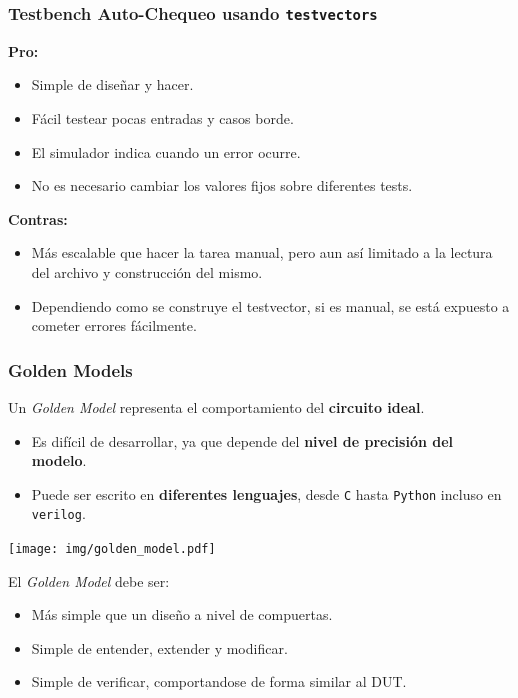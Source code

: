 \documentclass[aspectratio=169]{beamer}
\begin{document}
\begin{frame}[fragile,t]
    \frametitle{Testbench Auto-Chequeo usando \texttt{testvectors}}
    \textcolor{v}{\textbf{Pro:}}\\
    \begin{itemize}
    \item Simple de diseñar y hacer.
    \item Fácil testear pocas entradas y casos borde.
    \item El simulador indica cuando un error ocurre.
    \item No es necesario cambiar los valores fijos sobre diferentes tests.
    \end{itemize}
    \pause
    \textcolor{r}{\textbf{Contras:}}\\
    \begin{itemize}
    \item Más escalable que hacer la tarea manual, pero aun así limitado a la lectura del archivo y construcción del mismo.
    \item Dependiendo como se construye el testvector, si es manual, se está expuesto a cometer errores fácilmente.
    \end{itemize}
\end{frame}

\begin{frame}[fragile,t]
    \frametitle{Golden Models}
    Un \emph{Golden Model} representa el comportamiento del \textbf{circuito ideal}.
    \begin{itemize}
    \item Es difícil de desarrollar, ya que depende del \textbf{nivel de precisión del modelo}.
    \item Puede ser escrito en \textbf{diferentes lenguajes}, desde \texttt{C} hasta \texttt{Python} incluso en \texttt{verilog}.
    \end{itemize}
    \begin{center}
    \texttt{[image: img/golden\_model.pdf]}
    \end{center}
    \pause
    El \emph{Golden Model} debe ser:
    \begin{itemize}
    \item \textcolor{verdeuca}{Más simple que un diseño a nivel de compuertas.}
    \item \textcolor{verdeuca}{Simple de entender, extender y modificar.}
    \item \textcolor{verdeuca}{Simple de verificar, comportandose de forma similar al DUT.}
    \end{itemize}
\end{frame}
\end{document}
